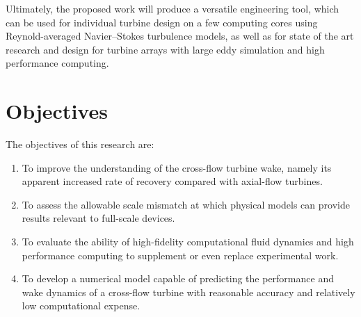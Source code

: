 Ultimately, the proposed work will produce a versatile engineering tool, which
can be used for individual turbine design on a few computing cores using
Reynold-averaged Navier--Stokes turbulence models, as well as for state of the
art research and design for turbine arrays with large eddy simulation and high
performance computing.


\section{Objectives}

The objectives of this research are:

\begin{enumerate}

	\item To improve the understanding of the cross-flow turbine wake, namely its
	apparent increased rate of recovery compared with axial-flow turbines.
	
	\item To assess the allowable scale mismatch at which physical models can
	provide results relevant to full-scale devices.
	
	\item To evaluate the ability of high-fidelity computational fluid dynamics and
	high performance computing to supplement or even replace experimental work.
	
	\item To develop a numerical model capable of predicting the performance and
	wake dynamics of a cross-flow turbine with reasonable accuracy and relatively
	low computational expense.

\end{enumerate}